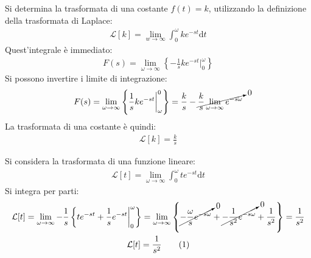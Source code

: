 \documentclass{article}
\newcommand{\df}{\mathrm{d}}
\numberwithin{equation}{subsection}
\newcommand{\tageq}{\tag{\stepcounter{equation}\theequation}}
\begin{document}
Si determina la trasformata di una costante $f(t)=k$, utilizzando la definizione della trasformata di Laplace:
\begin{gather*}
    \mathcal{L}[k]=\lim_{w\to\infty}\int_0^\omega ke^{-st}\df t
\end{gather*}
Quest'integrale è immediato:
\begin{gather*}
    F(s)=\lim_{\omega\to\infty}\left\{-\frac{1}{s}ke^{-st}\bigg|_0^\omega\right\}
\end{gather*}
Si possono invertire i limite di integrazione:
\begin{gather*}
    F(s)=\lim_{\omega\to\infty}\left\{\frac{1}{s}ke^{-st}\bigg|_\omega^0\right\}=
    \frac{k}{s}-\cancelto{0}{\frac{k}{s}\lim_{\omega\to\infty}e^{-s\omega}}
\end{gather*}
La trasformata di una costante è quindi:
\begin{gather}
    \mathcal{L}[k]=\frac{k}{s}
\end{gather}


Si considera la trasformata di una funzione lineare:
\begin{gather*}
    \mathcal{L}[t]=\lim_{\omega\to\infty}\int_0^\omega te^{-st}\df t
\end{gather*}
Si integra per parti:
\begin{gather*}
    \mathcal{L}[t]=\lim_{\omega\to\infty}-\frac{1}{s}\left\{te^{-st}+\frac{1}{s}e^{-st}\bigg|_0^\omega\right\}=
    \lim_{\omega\to\infty}\left\{\cancelto{0}{-\frac{\omega}{s} e^{-s\omega}}+\cancelto{0}{-\frac{1}{s^2}e^{-s\omega}}+\frac{1}{s^2}\right\}=\frac{1}{s^2}\\
    \mathcal{L}[t]=\frac{1}{s^2}\tageq
\end{gather*}
\end{document}
